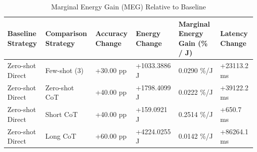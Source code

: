 \begin{table}
\caption{Marginal Energy Gain (MEG) Relative to Baseline}
\label{tab:marginal_energy_gain}
\begin{tabular}{llllll}
\toprule
Baseline Strategy & Comparison Strategy & Accuracy Change & Energy Change & Marginal Energy Gain (\% / J) & Latency Change \\
\midrule
Zero-shot Direct & Few-shot (3) & +30.00 pp & +1033.3886 J & 0.0290 \%/J & +23113.2 ms \\
Zero-shot Direct & Zero-shot CoT & +40.00 pp & +1798.4099 J & 0.0222 \%/J & +39122.2 ms \\
Zero-shot Direct & Short CoT & +40.00 pp & +159.0921 J & 0.2514 \%/J & +650.7 ms \\
Zero-shot Direct & Long CoT & +60.00 pp & +4224.0255 J & 0.0142 \%/J & +86264.1 ms \\
\bottomrule
\end{tabular}
\end{table}
